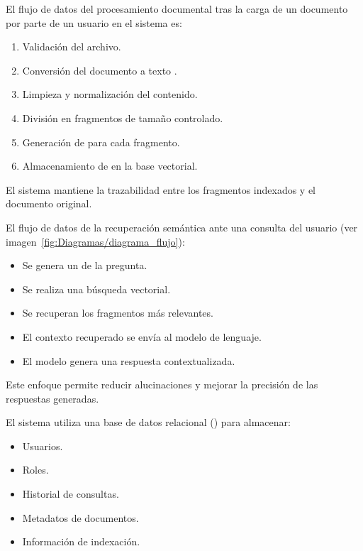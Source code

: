
El flujo de datos del procesamiento documental tras la carga de un documento por parte de un usuario en el sistema es:

\begin{enumerate}
\tightlist
	\item Validación del archivo.	
	\item Conversión del documento a texto .
	\item Limpieza y normalización del contenido.
	\item División en fragmentos de tamaño controlado.
	\item Generación de  para cada fragmento.
	\item Almacenamiento de  en la base vectorial.
\end{enumerate}

El sistema mantiene la trazabilidad entre los fragmentos indexados y el documento original.

El flujo de datos de la recuperación semántica ante una consulta del usuario (ver imagen~\ref{fig:Diagramas/diagrama_flujo}):

\begin{itemize}
\tightlist
	\item Se genera un  de la pregunta.
	\item Se realiza una búsqueda vectorial.
	\item Se recuperan los fragmentos más relevantes.
	\item El contexto recuperado se envía al modelo de lenguaje.
	\item El modelo genera una respuesta contextualizada.
\end{itemize}

Este enfoque permite reducir alucinaciones y mejorar la precisión de las respuestas generadas.


El sistema utiliza una base de datos relacional () para almacenar:

\begin{itemize}
\tightlist
	\item Usuarios.
	\item Roles.
	\item Historial de consultas.
	\item Metadatos de documentos.
	\item Información de indexación.
\end{itemize}

